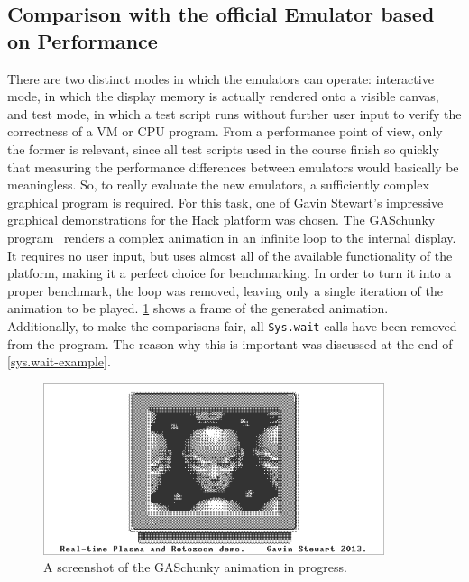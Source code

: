 
\subsection{Comparison with the official Emulator based on Performance} \label{sec:benchmarks}
There are two distinct modes in which the emulators can operate: interactive mode, in which the display memory is actually rendered onto a visible canvas, and test mode, in which a test script runs without further user input to verify the correctness of a VM or CPU program.
From a performance point of view, only the former is relevant, since all test scripts used in the course finish so quickly that measuring the performance differences between emulators would basically be meaningless.
So, to really evaluate the new emulators, a sufficiently complex graphical program is required.
For this task, one of Gavin Stewart's impressive graphical demonstrations for the Hack platform was chosen.
The GASchunky program~\cite{demos} renders a complex animation in an infinite loop to the internal display.
It requires no user input, but uses almost all of the available functionality of the platform, making it a perfect choice for benchmarking.
In order to turn it into a proper benchmark, the loop was removed, leaving only a single iteration of the animation to be played.
\cref{fig:gaschunky-screenshot} shows a frame of the generated animation.
Additionally, to make the comparisons fair, all \verb+Sys.wait+ calls have been removed from the program.
The reason why this is important was discussed at the end of \cref{sys.wait-example}.
\begin{center}
  \begin{figure}[ht]
    \centering
    \includegraphics[width=10cm]{fig/gaschunky.png}
    \caption{A screenshot of the GASchunky animation in progress.}%
    \label{fig:gaschunky-screenshot}
  \end{figure}
\end{center}
